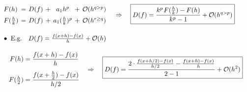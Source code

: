 \documentclass[12pt]{article}
\newcommand{\hs}{\hspace{1pt}}
\begin{document}
\vspace{5pt}
\(\hspace{10pt}
    \begin{aligned}
        &\arraycolsep=2pt \begin{array}{l c c c c c c}
                F(h) &= 
                    &D(f) 
                    &+ 
                    &a_1 h^p 
                    &+ 
                    &\mathcal{O}(h^{q > p})
                    \\[5pt]
                F(\tfrac{h}{k}) &=   
                    &D(f) 
                    &+ 
                    &a_1 ( \tfrac{h}{k} )^p 
                    &+ 
                    &\mathcal{O}(h^{r \geq q})
            \end{array}
            \hspace{10pt} \Rightarrow \hspace{10pt}
            \boxed{ D(f) = \frac{ k^{p} \hs F( \tfrac{h}{k} ) - F(h) }{ k^{p} - 1 } + \mathcal{O}(h^{q>p}) }
            \\[10pt]
        &\bullet\ \text{E.g.} \hspace{10pt} D(f) = \tfrac{f(x+h) - f(x)}{h} + \mathcal{O}(h)
            \\[10pt]
        &\hspace{10pt}\begin{aligned}
                F(h) &= \frac{f(x+h) - f(x)}{h}\\[5pt]
                F(\tfrac{h}{2}) &= \frac{f(x + \tfrac{h}{2}) - f(x)}{h/2}
            \end{aligned}
            \hspace{10pt} \Rightarrow \hspace{10pt}
            \boxed{ 
                D(f) = \frac{ 
                    2 \cdot \tfrac{f(x + h/2) - f(x)}{h/2} 
                    - \tfrac{f(x+h) - f(x)}{h}
                }{ 2-1 }
                + \mathcal{O}(h^2)
            }
    \end{aligned}
\)

%
\newpage
\end{document}

